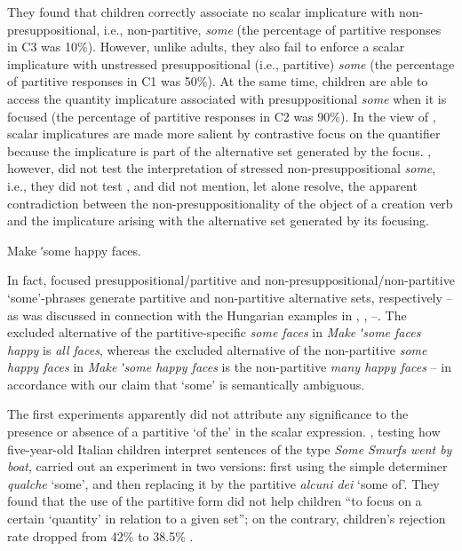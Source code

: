 \documentclass[output=paper]{langscibook}
\begin{document}
\noindent They found that children correctly associate no scalar implicature with non-pre\-suppositional, i.e., non-partitive, \textit{some} (the percentage of partitive responses in C3 was 10\%). However, unlike adults, they also fail to enforce a scalar implicature with unstressed presuppositional (i.e., partitive) \textit{some} (the percentage of partitive responses in C1 was 50\%). At the same time, children are able to access the quantity implicature associated with presuppositional \textit{some} when it is focused (the percentage of partitive responses in C2 was 90\%). In the view of \citeauthor{miller2005young}, scalar implicatures are made more salient by contrastive focus on the quantifier because the implicature is part of the alternative set generated by the focus. \citeauthor{miller2005young}, however, did not test the interpretation of stressed non-presuppositional \textit{some}, i.e., they did not test , and did not mention, let alone resolve, the apparent contradiction between the non-presuppositionality of the object of a creation verb and the implicature arising with the alternative set generated by its focusing. 

\ea Make ʹsome happy faces. \label{kis-zet:happy faces}
\z

\noindent In fact, focused presuppositional/partitive and non-presuppositional/non-partitive `some'-phrases generate partitive and non-partitive alternative sets, respectively – as was discussed in connection with the Hungarian examples in , , --. The excluded alternative of the partitive-specific \textit{some faces} in \textit{Make ʹsome faces happy} is \textit{all faces}, whereas the excluded alternative of the non-partitive \textit{some happy faces} in \textit{Make ʹsome happy faces} is the non-partitive \textit{many happy faces} – in accordance with our claim that `some' is semantically ambiguous.

The first experiments apparently did not attribute any significance to the presence or absence of a partitive `of the' in the scalar expression. \citet{foppolo2012scalar}, testing how five-year-old Italian children interpret sentences of the type \textit{Some Smurfs went by boat}, carried out an experiment in two versions: first using the simple determiner \textit{qualche} `some', and then replacing it by the partitive \textit{alcuni dei} `some of'. They found that the use of the partitive form did not help children “to focus on a certain `quantity' in relation to a given set”; on the contrary, children’s rejection rate dropped from 42\% to 38.5\% \citep[371]{foppolo2012scalar}. 
\end{document}
